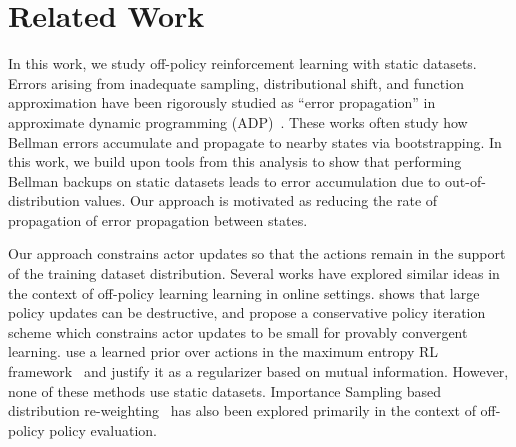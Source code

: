 \section{Related Work}
\label{sec:related}
\vspace{-10pt}
In this work, we study off-policy reinforcement learning with static datasets. Errors arising from inadequate sampling, distributional shift, and function approximation have been rigorously studied as ``error propagation'' in approximate dynamic programming (ADP)~\citep{bertsekas1996ndp,munos2003errorapi,farahmand2010error,bruno2015approximate}. These works often study how Bellman errors accumulate and propagate to nearby states via bootstrapping. In this work, we build upon tools from this analysis to show that performing Bellman backups on static datasets leads to error accumulation due to out-of-distribution values. Our approach is motivated as reducing the rate of propagation of error propagation between states.


Our approach constrains actor updates so that the actions remain in the support of the training dataset distribution. Several works have explored similar ideas in the context of off-policy learning learning in online settings. \citet{kakade2002cpi} shows that large policy updates can be destructive, and propose a conservative policy iteration scheme which constrains actor updates to be small for provably convergent learning. \citet{grau-moya2018soft} use a learned prior over actions in the maximum entropy RL framework~\citep{levine2018rlasinference} and justify it as a regularizer based on mutual information. However, none of these methods use static datasets. Importance Sampling based distribution re-weighting~\cite{munos2016safe,gelada2019off,precup2001offpol,mahmood2015emphatic} has also been explored primarily in the context of off-policy policy evaluation.

